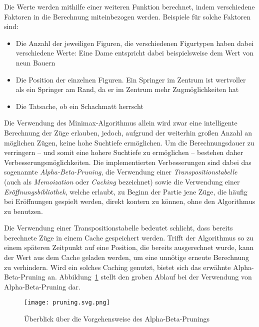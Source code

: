 Die Werte werden mithilfe einer weiteren Funktion berechnet, indem verschiedene Faktoren in die Berechnung miteinbezogen werden. Beispiele für solche Faktoren sind:

\begin{itemize}
    \item Die Anzahl der jeweiligen Figuren, die verschiedenen Figurtypen haben dabei verschiedene Werte: Eine Dame entspricht dabei beispielsweise dem Wert von neun Bauern
    \item Die Position der einzelnen Figuren. Ein Springer im Zentrum ist wertvoller als ein Springer am Rand, da er im Zentrum mehr Zugmöglichkeiten hat
    \item Die Tatsache, ob ein Schachmatt herrscht
\end{itemize}

Die Verwendung des Minimax-Algorithmus allein wird zwar eine intelligente Berechnung der Züge erlauben, jedoch, aufgrund der weiterhin großen Anzahl an möglichen Zügen, keine hohe Suchtiefe ermöglichen. Um die Berechnungsdauer zu verringern -- und somit eine hohere Suchtiefe zu ermöglichen -- bestehen daher Verbesserungsmöglichkeiten. Die implementierten Verbesserungen sind dabei das sogenannte \textit{Alpha-Beta-Pruning}, die Verwendung einer \textit{Transpositionstabelle} (auch als \textit{Memoization} oder \textit{Caching} bezeichnet) sowie die Verwendung einer \textit{Eröffnungsbibliothek}, welche erlaubt, zu Beginn der Partie jene Züge, die häufig bei Eröffnungen gespielt werden, direkt kontern zu können, ohne den Algorithmus zu benutzen.

Die Verwendung einer Transpositionstabelle bedeutet schlicht, dass bereits berechnete Züge in einem Cache gespeichert werden. Trifft der Algorithmus so zu einem späteren Zeitpunkt auf eine Position, die bereits ausgerechnet wurde, kann der Wert aus dem Cache geladen werden, um eine unnötige erneute Berechnung zu verhindern. Wird ein solches Caching genutzt, bietet sich das erwähnte Alpha-Beta-Pruning an. Abbildung~\ref{fig:pruning} stellt den groben Ablauf bei der Verwendung von Alpha-Beta-Pruning dar.

\begin{figure}[H]
	\texttt{[image: pruning.svg.png]}
	\caption{Überblick über die Vorgehensweise des Alpha-Beta-Prunings\footnotemark}
	\label{fig:pruning}
\end{figure}

